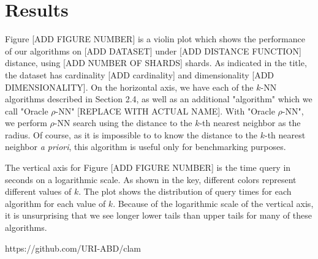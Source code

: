 \section{Results}
\label{sec:results}



Figure [ADD FIGURE NUMBER] is a violin plot which shows the performance of our algorithms
on [ADD DATASET] under [ADD DISTANCE FUNCTION] distance, using [ADD NUMBER OF SHARDS] shards.
As indicated in the title, the dataset has cardinality [ADD cardinality] and dimensionality [ADD DIMENSIONALITY].
On the horizontal axis, we have each of the $k$-NN algorithms described in Section 2.4, as well as  
an additional "algorithm" which we call "Oracle $\rho$-NN" [REPLACE WITH ACTUAL NAME].  With "Oracle $\rho$-NN", we perform $\rho$-NN search using the 
distance to the $k$-th nearest neighbor as the radius. Of course, as it is impossible to
to know the distance to the $k$-th nearest neighbor \emph{a priori}, this algorithm 
is useful only for benchmarking purposes.

The vertical axis for Figure [ADD FIGURE NUMBER] is the time query in seconds on a logarithmic scale. 
As shown in the key, different colors represent different values of $k$. 
The plot shows the distribution of query times for each algorithm for each value of $k$. 
Because of the logarithmic scale of the vertical axis, it is unsurprising that we 
see longer lower tails than upper tails for many of these algorithms. 


https://github.com/URI-ABD/clam

